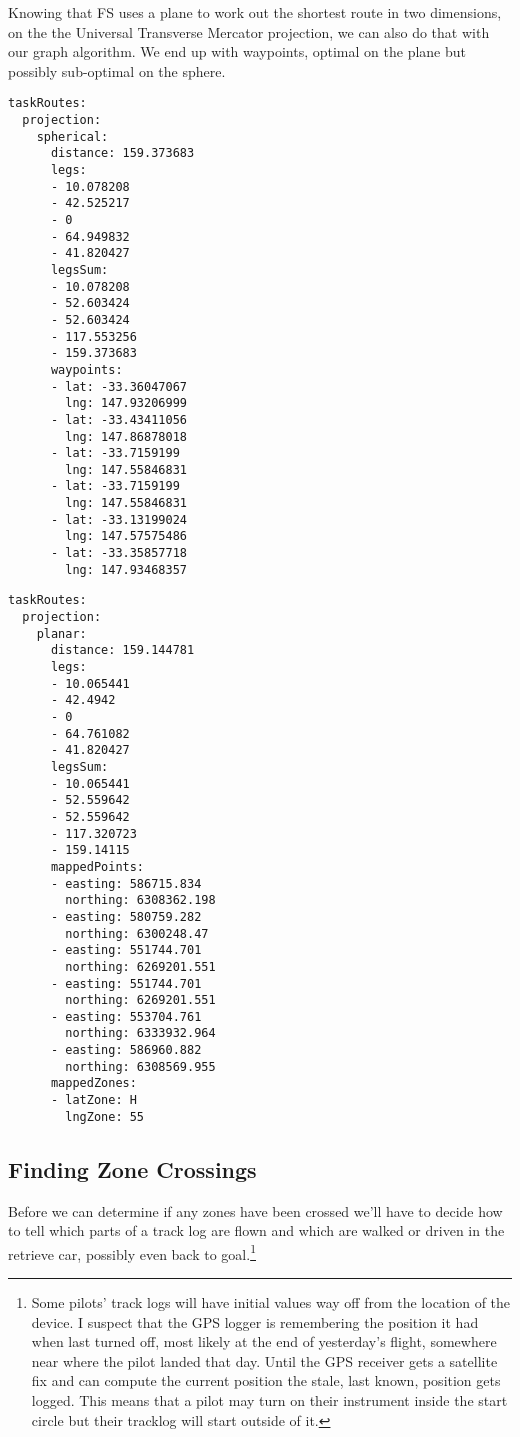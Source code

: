 \documentclass[gap.tex]{subfiles}
\begin{document}
\newpage
Knowing that FS uses a plane to work out the shortest route in two dimensions,
on the the Universal Transverse Mercator projection, we can also do that with
our graph algorithm. We end up with waypoints, optimal on the plane but
possibly sub-optimal on the sphere.

\begin{lstlisting}[caption={Points on the plane, distances on the sphere,
\texttt{projection/spherical} nodes of \texttt{*.task-length.yaml}.}]
taskRoutes:
  projection:
    spherical:
      distance: 159.373683
      legs:
      - 10.078208
      - 42.525217
      - 0
      - 64.949832
      - 41.820427
      legsSum:
      - 10.078208
      - 52.603424
      - 52.603424
      - 117.553256
      - 159.373683
      waypoints:
      - lat: -33.36047067
        lng: 147.93206999
      - lat: -33.43411056
        lng: 147.86878018
      - lat: -33.7159199
        lng: 147.55846831
      - lat: -33.7159199
        lng: 147.55846831
      - lat: -33.13199024
        lng: 147.57575486
      - lat: -33.35857718
        lng: 147.93468357
\end{lstlisting}
\begin{lstlisting}[caption={Points and distances on the plane,
\texttt{projection/planar} nodes of \texttt{*.task-length.yaml}.}]
taskRoutes:
  projection:
    planar:
      distance: 159.144781
      legs:
      - 10.065441
      - 42.4942
      - 0
      - 64.761082
      - 41.820427
      legsSum:
      - 10.065441
      - 52.559642
      - 52.559642
      - 117.320723
      - 159.14115
      mappedPoints:
      - easting: 586715.834
        northing: 6308362.198
      - easting: 580759.282
        northing: 6300248.47
      - easting: 551744.701
        northing: 6269201.551
      - easting: 551744.701
        northing: 6269201.551
      - easting: 553704.761
        northing: 6333932.964
      - easting: 586960.882
        northing: 6308569.955
      mappedZones:
      - latZone: H
        lngZone: 55
\end{lstlisting}

\newpage
\subsection{Finding Zone Crossings}

Before we can determine if any zones have been crossed we'll have to decide how
to tell which parts of a track log are flown and which are walked or driven in
the retrieve car, possibly even back to goal.\footnote{Some pilots' track logs
will have initial values way off from the location of the device.  I suspect
that the GPS logger is remembering the position it had when last turned off,
most likely at the end of yesterday's flight, somewhere near where the pilot
landed that day. Until the GPS receiver gets a satellite fix and can compute
the current position the stale, last known, position gets logged. This means
that a pilot may turn on their instrument inside the start circle but their
tracklog will start outside of it.}
\end{document}
